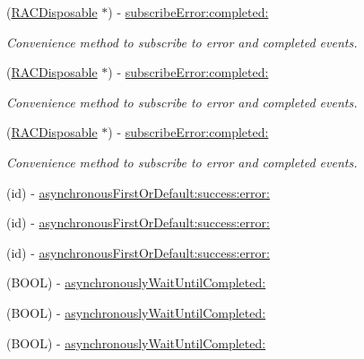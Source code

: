 \begin{DoxyCompactItemize}
\mbox{\label{interface_r_a_c_signal_aad432a4ebbe885ea4bb606097a60e474}} 
(\mbox{\hyperlink{interface_r_a_c_disposable}{R\+A\+C\+Disposable}} $\ast$) -\/ \mbox{\hyperlink{interface_r_a_c_signal_aad432a4ebbe885ea4bb606097a60e474}{subscribe\+Error\+:completed\+:}}
\begin{DoxyCompactList}\small\item\em Convenience method to subscribe to {\ttfamily error} and {\ttfamily completed} events. \end{DoxyCompactList}\item 
\mbox{\label{interface_r_a_c_signal_aad432a4ebbe885ea4bb606097a60e474}} 
(\mbox{\hyperlink{interface_r_a_c_disposable}{R\+A\+C\+Disposable}} $\ast$) -\/ \mbox{\hyperlink{interface_r_a_c_signal_aad432a4ebbe885ea4bb606097a60e474}{subscribe\+Error\+:completed\+:}}
\begin{DoxyCompactList}\small\item\em Convenience method to subscribe to {\ttfamily error} and {\ttfamily completed} events. \end{DoxyCompactList}\item 
\mbox{\label{interface_r_a_c_signal_aad432a4ebbe885ea4bb606097a60e474}} 
(\mbox{\hyperlink{interface_r_a_c_disposable}{R\+A\+C\+Disposable}} $\ast$) -\/ \mbox{\hyperlink{interface_r_a_c_signal_aad432a4ebbe885ea4bb606097a60e474}{subscribe\+Error\+:completed\+:}}
\begin{DoxyCompactList}\small\item\em Convenience method to subscribe to {\ttfamily error} and {\ttfamily completed} events. \end{DoxyCompactList}\item 
(id) -\/ \mbox{\hyperlink{interface_r_a_c_signal_a477114852c0e761a023a35e35ccc1784}{asynchronous\+First\+Or\+Default\+:success\+:error\+:}}
\item 
(id) -\/ \mbox{\hyperlink{interface_r_a_c_signal_a477114852c0e761a023a35e35ccc1784}{asynchronous\+First\+Or\+Default\+:success\+:error\+:}}
\item 
(id) -\/ \mbox{\hyperlink{interface_r_a_c_signal_a477114852c0e761a023a35e35ccc1784}{asynchronous\+First\+Or\+Default\+:success\+:error\+:}}
\item 
(B\+O\+OL) -\/ \mbox{\hyperlink{interface_r_a_c_signal_a29ac4be53792963e1c7e5c59e545e6cd}{asynchronously\+Wait\+Until\+Completed\+:}}
\item 
(B\+O\+OL) -\/ \mbox{\hyperlink{interface_r_a_c_signal_a29ac4be53792963e1c7e5c59e545e6cd}{asynchronously\+Wait\+Until\+Completed\+:}}
\item 
(B\+O\+OL) -\/ \mbox{\hyperlink{interface_r_a_c_signal_a29ac4be53792963e1c7e5c59e545e6cd}{asynchronously\+Wait\+Until\+Completed\+:}}
\end{DoxyCompactItemize}
